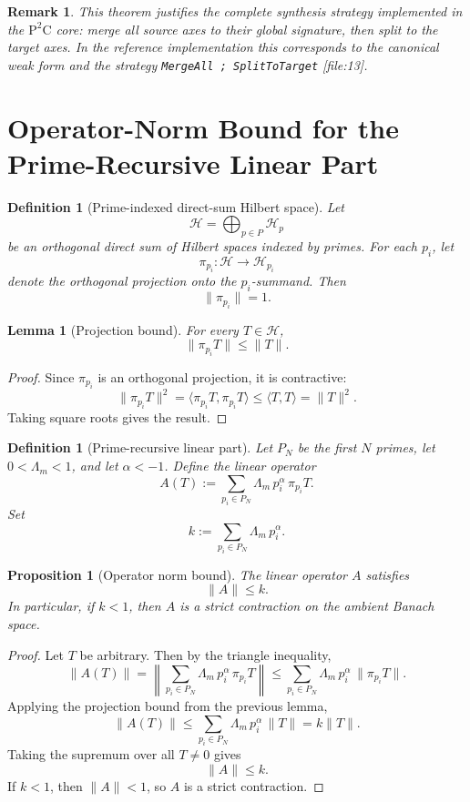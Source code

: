 \documentclass[11pt,a4paper]{article}
\newtheorem{proposition}[theorem]{Proposition}
\newtheorem{remark}[theorem]{Remark}
\newtheorem{definition}[theorem]{Definition}
\newtheorem{lemma}[theorem]{Lemma}
\begin{document}
\begin{remark}
This theorem justifies the complete synthesis strategy implemented in the \(\mathrm{P}^2\mathrm{C}\) core: merge all source axes to their global signature, then split to the target axes. In the reference implementation this corresponds to the canonical weak form and the strategy \texttt{MergeAll ; SplitToTarget} [file:13].
\end{remark}

\section{Operator-Norm Bound for the Prime-Recursive Linear Part}

\begin{definition}[Prime-indexed direct-sum Hilbert space]
Let
\[
\mathcal{H} = \bigoplus_{p\in P} \mathcal{H}_p
\]
be an orthogonal direct sum of Hilbert spaces indexed by primes. For each \(p_i\), let
\[
\pi_{p_i} : \mathcal{H} \to \mathcal{H}_{p_i}
\]
denote the orthogonal projection onto the \(p_i\)-summand. Then
\[
\|\pi_{p_i}\| = 1.
\]
\end{definition}

\begin{lemma}[Projection bound]
For every \(T \in \mathcal{H}\),
\[
\| \pi_{p_i} T \| \le \|T\|.
\]
\end{lemma}

\begin{proof}
Since \(\pi_{p_i}\) is an orthogonal projection, it is contractive:
\[
\|\pi_{p_i}T\|^2
=
\langle \pi_{p_i}T,\pi_{p_i}T\rangle
\le
\langle T,T\rangle
=
\|T\|^2.
\]
Taking square roots gives the result.
\end{proof}

\begin{definition}[Prime-recursive linear part]
Let \(P_N\) be the first \(N\) primes, let \(0<\Lambda_m<1\), and let \(\alpha< -1\). Define the linear operator
\[
A(T) := \sum_{p_i\in P_N} \Lambda_m\, p_i^\alpha\, \pi_{p_i}T.
\]
Set
\[
k := \sum_{p_i\in P_N} \Lambda_m\, p_i^\alpha.
\]
\end{definition}

\begin{proposition}[Operator norm bound]
The linear operator \(A\) satisfies
\[
\|A\| \le k.
\]
In particular, if \(k<1\), then \(A\) is a strict contraction on the ambient Banach space.
\end{proposition}

\begin{proof}
Let \(T\) be arbitrary. Then by the triangle inequality,
\[
\|A(T)\|
=
\left\|
\sum_{p_i\in P_N}\Lambda_m\, p_i^\alpha\, \pi_{p_i}T
\right\|
\le
\sum_{p_i\in P_N}\Lambda_m\, p_i^\alpha\, \|\pi_{p_i}T\|.
\]
Applying the projection bound from the previous lemma,
\[
\|A(T)\|
\le
\sum_{p_i\in P_N}\Lambda_m\, p_i^\alpha\, \|T\|
=
k\|T\|.
\]
Taking the supremum over all \(T\neq 0\) gives
\[
\|A\|\le k.
\]
If \(k<1\), then \(\|A\|<1\), so \(A\) is a strict contraction.
\end{proof}
\end{document}
